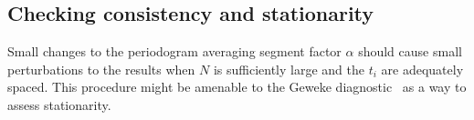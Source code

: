 \documentclass[letterpaper,11pt,nointlimits,reqno]{amsart}
\begin{document}
\subsection*{Checking consistency and stationarity}

Small changes to the periodogram averaging segment factor $\alpha$ should cause
small perturbations to the results when $N$ is sufficiently large and the $t_i$
are adequately spaced.  This procedure might be amenable to the Geweke
diagnostic~\cite{Geweke1992Evaluating} as a way to assess stationarity.




\end{document}
